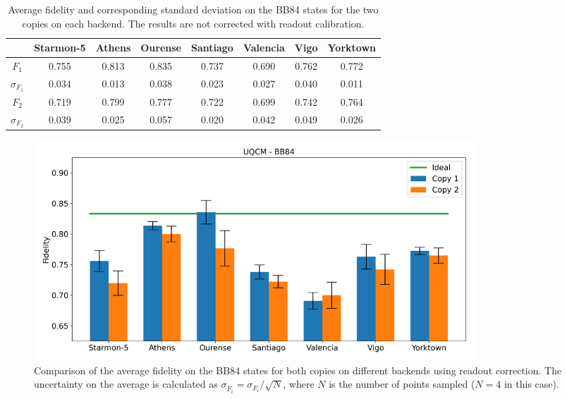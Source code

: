 \begin{table}[H]
    \centering
    \begin{tabular}{|c|c|c|c|c|c|c|c|}
    \hline
    \textbf{} & \textbf{Starmon-5} & \textbf{Athens} & \textbf{Ourense} & \textbf{Santiago} & \textbf{Valencia} & \textbf{Vigo} & \textbf{Yorktown} \\ \hline
    $F_1$              & 0.755 & 0.813 & 0.835 & 0.737 & 0.690 & 0.762 & 0.772\\ \hline
    $\sigma_{F_1}$     & 0.034 & 0.013 & 0.038 & 0.023 & 0.027 & 0.040 & 0.011 \\ \hline
    $F_2$              & 0.719 & 0.799 & 0.777 & 0.722 & 0.699 & 0.742 & 0.764 \\ \hline
    $\sigma_{F_2}$     & 0.039 & 0.025 & 0.057 & 0.020 & 0.042 & 0.049 & 0.026 \\ \hline
    \end{tabular}
    \caption{Average fidelity and corresponding standard deviation on the BB84 states for the two copies on each backend. The results are not corrected with readout calibration.}\label{tab:uqcm_results_bb_non}
\end{table}

\begin{figure}[H]
    \centering
            \includegraphics[width=0.8\textwidth]{Figures/UQCM/Histograms/histo_bb84.png}
        
        \caption{Comparison of the average fidelity on the BB84 states for both copies on different backends using readout correction. The uncertainty on the average is calculated as $\sigma_{\overline{F}_i}=\sigma_{F_i}/\sqrt{N}$, where $N$ is the number of points sampled ($N=4$ in this case).}\label{fig:hist_uqcm_bb84}
\end{figure}

